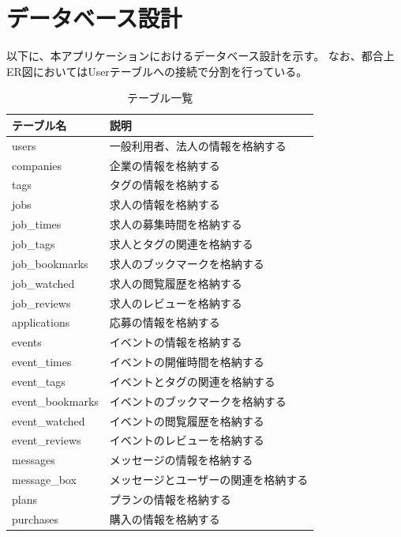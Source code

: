 \section{データベース設計}
以下に、本アプリケーションにおけるデータベース設計を示す。
なお、都合上ER図においてはUserテーブルへの接続で分割を行っている。

\begin{table}[H]
  \centering
  \caption{テーブル一覧}
  \label{tab:table-list}
  \begin{tabular}{|l|l|} \hline
    テーブル名            & 説明                 \\ \hline \hline
    users            & 一般利用者、法人の情報を格納する   \\ \hline
    companies        & 企業の情報を格納する         \\ \hline
    tags             & タグの情報を格納する         \\ \hline
    jobs             & 求人の情報を格納する         \\ \hline
    job\_times       & 求人の募集時間を格納する       \\ \hline
    job\_tags        & 求人とタグの関連を格納する      \\ \hline
    job\_bookmarks   & 求人のブックマークを格納する     \\ \hline
    job\_watched     & 求人の閲覧履歴を格納する       \\ \hline
    job\_reviews     & 求人のレビューを格納する       \\ \hline
    applications     & 応募の情報を格納する         \\ \hline
    events           & イベントの情報を格納する       \\ \hline
    event\_times     & イベントの開催時間を格納する     \\ \hline
    event\_tags      & イベントとタグの関連を格納する    \\ \hline
    event\_bookmarks & イベントのブックマークを格納する   \\ \hline
    event\_watched   & イベントの閲覧履歴を格納する     \\ \hline
    event\_reviews   & イベントのレビューを格納する     \\ \hline
    messages         & メッセージの情報を格納する      \\ \hline
    message\_box     & メッセージとユーザーの関連を格納する \\ \hline
    plans            & プランの情報を格納する        \\ \hline
    purchases        & 購入の情報を格納する         \\ \hline
  \end{tabular}
\end{table}

